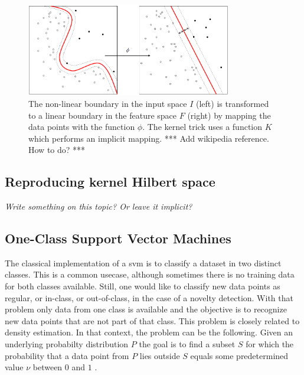 \begin{figure}
\centering
  \includegraphics[width=0.8\textwidth]{./Figures/chapter3/svm_kernel_mapping.png}
  \caption[Kernel mapping]{The non-linear boundary in the input space $I$ (left) is transformed to a linear boundary in the feature space $F$ (right) by mapping the data points with the function $\phi$. The kernel trick uses a function $K$ which performs an implicit mapping. *** Add wikipedia reference. How to do? ***}
  \label{fig:kernel_mapping}
\end{figure}



\subsection{Reproducing kernel Hilbert space}
\emph{Write something on this topic? Or leave it implicit?}



\subsection{One-Class Support Vector Machines}\label{subsec:one-class-svm}
The classical implementation of a \gls{svm} is to classify a dataset in two distinct classes.
This is a common usecase, although sometimes there is no training data for both classes available.
Still, one would like to classify new data points as regular, or in-class, or out-of-class, \eg in the case of a novelty detection.
With that problem only data from one class is available and the objective is to recognize new data points that are not part of that class.
This problem is closely related to density estimation.
In that context, the problem can be the following.
Given an underlying probabilty distribution $P$ the goal is to find a subset $S$ for which the probability that a data point from $P$ lies outside $S$ equals some predetermined value $\nu$ between $0$ and $1$ \cite{scholkopf1999support}.


